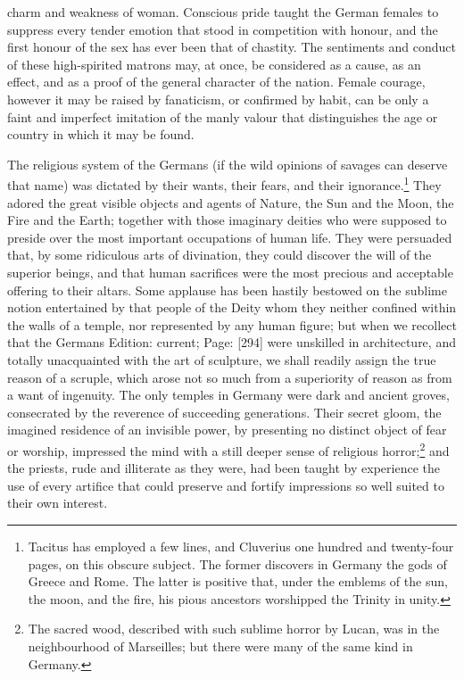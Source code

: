 charm and weakness of woman. Conscious pride taught the German females to suppress every tender emotion that stood in competition with honour, and the first honour of the sex has ever been that of chastity. The sentiments and conduct of these high-spirited matrons may, at once, be considered as a cause, as an effect, and as a proof of the general character of the nation. Female courage, however it may be raised by fanaticism, or confirmed by habit, can be only a faint and imperfect imitation of the manly valour that distinguishes the age or country in which it may be found.

The religious system of the Germans (if the wild opinions of savages can deserve that name) was dictated by their wants, their fears, and their ignorance.\footnote{Tacitus has employed a few lines, and Cluverius one hundred and twenty-four pages, on this obscure subject. The former discovers in Germany the gods of Greece and Rome. The latter is positive that, under the emblems of the sun, the moon, and the fire, his pious ancestors worshipped the Trinity in unity.} They adored the great visible objects and agents of Nature, the Sun and the Moon, the Fire and the Earth; together with those imaginary deities who were supposed to preside over the most important occupations of human life. They were persuaded that, by some ridiculous arts of divination, they could discover the will of the superior beings, and that human sacrifices were the most precious and acceptable offering to their altars. Some applause has been hastily bestowed on the sublime notion entertained by that people of the Deity whom they neither confined within the walls of a temple, nor represented by any human figure; but when we recollect that the Germans Edition: current; Page: [294] were unskilled in architecture, and totally unacquainted with the art of sculpture, we shall readily assign the true reason of a scruple, which arose not so much from a superiority of reason as from a want of ingenuity. The only temples in Germany were dark and ancient groves, consecrated by the reverence of succeeding generations. Their secret gloom, the imagined residence of an invisible power, by presenting no distinct object of fear or worship, impressed the mind with a still deeper sense of religious horror;\footnote{The sacred wood, described with such sublime horror by Lucan, was in the neighbourhood of Marseilles; but there were many of the same kind in Germany.} and the priests, rude and illiterate as they were, had been taught by experience the use of every artifice that could preserve and fortify impressions so well suited to their own interest.

